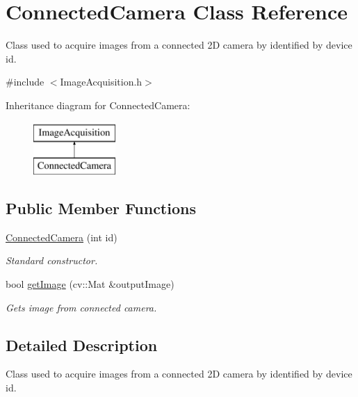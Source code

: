 \hypertarget{classConnectedCamera}{\section{\-Connected\-Camera \-Class \-Reference}
\label{classConnectedCamera}
}


\-Class used to acquire images from a connected 2\-D camera by identified by device id.  




{\ttfamily \#include $<$\-Image\-Acquisition.\-h$>$}

\-Inheritance diagram for \-Connected\-Camera\-:\begin{figure}[H]
\begin{center}
\leavevmode
\includegraphics[height=2.000000cm]{classConnectedCamera}
\end{center}
\end{figure}
\subsection*{\-Public \-Member \-Functions}
\begin{DoxyCompactItemize}
\item 
\hyperlink{classConnectedCamera_ae5cc81d793664312abeb1eca4dacd738}{\-Connected\-Camera} (int id)
\begin{DoxyCompactList}\small\item\em \-Standard constructor. \end{DoxyCompactList}\item 
bool \hyperlink{classConnectedCamera_a057b69fcbfcf601e95a3ff117d9bd6c3}{get\-Image} (cv\-::\-Mat \&output\-Image)
\begin{DoxyCompactList}\small\item\em \-Gets image from connected camera. \end{DoxyCompactList}\end{DoxyCompactItemize}


\subsection{\-Detailed \-Description}
\-Class used to acquire images from a connected 2\-D camera by identified by device id. 



